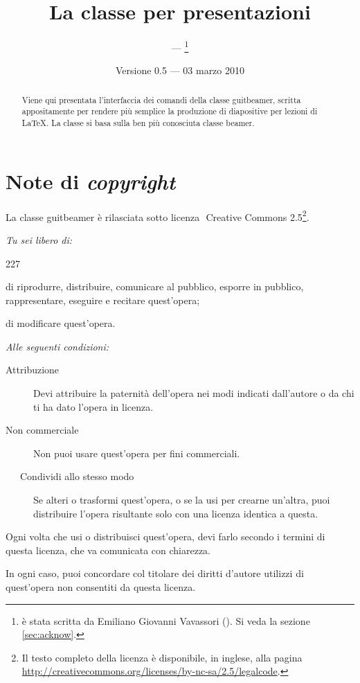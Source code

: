 \documentclass[a4paper,10pt]{article}
\title{La classe per presentazioni \pkg{guitbeamer}}
\author{{\LARGE\GuIT} --- \GuITtext\thanks{\cls{guitbeamer} \`e stata
scritta da Emiliano Giovanni Vavassori
(\email{testina@sssup.it}). Si veda
la sezione \ref{sec:acknow}.}}
\date{Versione 0.5 --- 03 marzo 2010}
\newcommand{\pkg}[1]{\textsf{#1}}
\let\cls\pkg
\begin{document}
\maketitle

\begin{abstract}
Viene qui presentata l'interfaccia dei comandi della classe
\cls{guitbeamer}, scritta appositamente per rendere più semplice la
produzione di diapositive per lezioni di \LaTeX. La classe si basa
sulla ben più conosciuta classe \cls{beamer}.
\end{abstract}

\tableofcontents
\newpage
\section*{Note di \textit{copyright}}
La classe \cls{guitbeamer} è rilasciata sotto licenza
$\!$\cc$\!\!\!$ Creative Commons 2.5\footnote{Il testo completo
della licenza è disponibile, in inglese, alla pagina
\url{http://creativecommons.org/licenses/by-nc-sa/2.5/legalcode}.}.

\noindent\emph{Tu sei libero di:}
\begin{dinglist}{227}
    \item di riprodurre, distribuire, comunicare al pubblico, esporre
	in pubblico, rappresentare, eseguire e recitare quest'opera;
    \item di modificare quest'opera.
\end{dinglist}

\noindent\emph{Alle seguenti condizioni:}
\begin{description}
    \item[\ccby Attribuzione]Devi attribuire la paternità dell'opera
	nei modi indicati dall'autore o da chi ti ha dato l'opera in
	licenza.
    \item[\ccnc Non commerciale]Non puoi usare
	quest'opera per fini commerciali.
    \item[\ \ccsa\ \ $\!\!$Condividi allo stesso modo]Se alteri o
	trasformi quest'opera, o se la usi per crearne un'altra, puoi
	distribuire l'opera risultante solo con una licenza identica a
	questa.
\end{description}

\begin{dinglist}{52}
    \item Ogni volta che usi o distribuisci quest'opera, devi farlo
	secondo i termini di questa licenza, che va comunicata con
	chiarezza.
    \item In ogni caso, puoi concordare col titolare dei diritti
	d'autore utilizzi di quest'opera non consentiti da questa
	licenza.
\end{dinglist}
\end{document}
